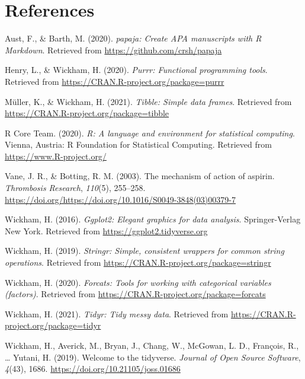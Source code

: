 \documentclass[
  english,
  man]{apa6}
\newlength{\cslhangindent}
\newenvironment{cslreferences}%
  {\setlength{\parindent}{0pt}%
  \everypar{\setlength{\hangindent}{\cslhangindent}}\ignorespaces}%
  {\par}
\begin{document}
\hypertarget{references}{%
\section{References}\label{references}}

\begingroup
\setlength{\parindent}{-0.5in}
\setlength{\leftskip}{0.5in}

\hypertarget{refs}{}
\begin{cslreferences}
\leavevmode\hypertarget{ref-R-papaja}{}%
Aust, F., \& Barth, M. (2020). \emph{papaja: Create APA manuscripts with R Markdown}. Retrieved from \url{https://github.com/crsh/papaja}

\leavevmode\hypertarget{ref-R-purrr}{}%
Henry, L., \& Wickham, H. (2020). \emph{Purrr: Functional programming tools}. Retrieved from \url{https://CRAN.R-project.org/package=purrr}

\leavevmode\hypertarget{ref-R-tibble}{}%
Müller, K., \& Wickham, H. (2021). \emph{Tibble: Simple data frames}. Retrieved from \url{https://CRAN.R-project.org/package=tibble}

\leavevmode\hypertarget{ref-R-base}{}%
R Core Team. (2020). \emph{R: A language and environment for statistical computing}. Vienna, Austria: R Foundation for Statistical Computing. Retrieved from \url{https://www.R-project.org/}

\leavevmode\hypertarget{ref-VANE2003255}{}%
Vane, J. R., \& Botting, R. M. (2003). The mechanism of action of aspirin. \emph{Thrombosis Research}, \emph{110}(5), 255--258. \url{https://doi.org/https://doi.org/10.1016/S0049-3848(03)00379-7}

\leavevmode\hypertarget{ref-R-ggplot2}{}%
Wickham, H. (2016). \emph{Ggplot2: Elegant graphics for data analysis}. Springer-Verlag New York. Retrieved from \url{https://ggplot2.tidyverse.org}

\leavevmode\hypertarget{ref-R-stringr}{}%
Wickham, H. (2019). \emph{Stringr: Simple, consistent wrappers for common string operations}. Retrieved from \url{https://CRAN.R-project.org/package=stringr}

\leavevmode\hypertarget{ref-R-forcats}{}%
Wickham, H. (2020). \emph{Forcats: Tools for working with categorical variables (factors)}. Retrieved from \url{https://CRAN.R-project.org/package=forcats}

\leavevmode\hypertarget{ref-R-tidyr}{}%
Wickham, H. (2021). \emph{Tidyr: Tidy messy data}. Retrieved from \url{https://CRAN.R-project.org/package=tidyr}

\leavevmode\hypertarget{ref-R-tidyverse}{}%
Wickham, H., Averick, M., Bryan, J., Chang, W., McGowan, L. D., François, R., \ldots{} Yutani, H. (2019). Welcome to the tidyverse. \emph{Journal of Open Source Software}, \emph{4}(43), 1686. \url{https://doi.org/10.21105/joss.01686}


\end{cslreferences}
\end{document}
